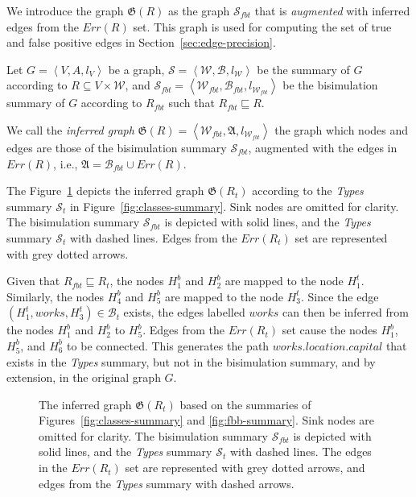 We introduce the graph $\mathfrak{G}(R)$ as the graph $\mathcal{S}_{fbt}$ that is \emph{augmented} with inferred edges from the $Err(R)$ set. This graph is used for computing the set of true and false positive edges in Section~\ref{sec:edge-precision}.

\begin{definition}
Let $G=\left\langle V, A, l_V \right\rangle$ be a graph, $\mathcal{S} = \left\langle \mathcal{W}, \mathcal{B}, l_{\mathcal{W}} \right\rangle$ be the summary of $G$ according to $R \subseteq V \times \mathcal{W}$, and $\mathcal{S}_{fbt} = \left\langle \mathcal{W}_{fbt}, \mathcal{B}_{fbt}, l_{\mathcal{W}_{fbt}} \right\rangle$ be the bisimulation summary of $G$ according to $R_{fbt}$ such that $R_{fbt} \sqsubseteq R$.

We call the \emph{inferred graph} $\mathfrak{G}(R) = \left\langle \mathcal{W}_{fbt}, \mathfrak{A}, l_{\mathcal{W}_{fbt}} \right\rangle$ the graph which nodes and edges are those of the bisimulation summary $\mathcal{S}_{fbt}$, augmented with the edges in $Err(R)$, i.e., $\mathfrak{A} = \mathcal{B}_{fbt} \cup Err(R)$.
\end{definition}

The Figure~\ref{fig:accuracy} depicts the inferred graph $\mathfrak{G}(R_t)$ according to the \emph{Types} summary $\mathcal{S}_t$ in Figure~\ref{fig:classes-summary}.
Sink nodes are omitted for clarity. The bisimulation summary $\mathcal{S}_{fbt}$ is depicted with solid lines, and the \emph{Types} summary $\mathcal{S}_t$ with dashed lines. Edges from the $Err(R_t)$ set are represented with grey dotted arrows.

Given that $R_{fbt} \sqsubseteq R_t$, the nodes $H^b_1$ and $H^b_2$ are mapped to the node $H^t_1$. Similarly, the nodes $H^b_4$ and $H^b_5$ are mapped to the node $H^t_3$. Since the edge $(H^t_1, works, H^t_3) \in \mathcal{B}_t$ exists, the edges labelled $works$ can then be inferred from the nodes $H^b_1$ and $H^b_2$ to $H^b_5$. Edges from the $Err(R_t)$ set cause the nodes $H^b_1$, $H^b_5$, and $H^b_6$ to be connected. This generates the path $works.location.capital$ that exists in the \emph{Types} summary, but not in the bisimulation summary, and by extension, in the original graph $G$.

\begin{figure}
	\centering
	\resizebox{\textwidth}{!}{
		
	}
	\caption{The inferred graph $\mathfrak{G}(R_t)$ based on the summaries of Figures~\ref{fig:classes-summary} and \ref{fig:fbb-summary}.
	Sink nodes are omitted for clarity. The bisimulation summary $\mathcal{S}_{fbt}$ is depicted with solid lines, and the \emph{Types} summary $\mathcal{S}_t$ with dashed lines. The edges in the $Err(R_t)$ set are represented with grey dotted arrows, and edges from the \emph{Types} summary with dashed arrows.}
	\label{fig:accuracy}
\end{figure}

